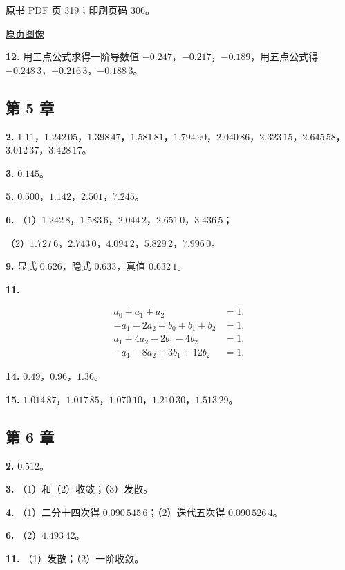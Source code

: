 \clearpage

原书 PDF 页 319；印刷页码 306。

\href{source-images/pdf-319.jpeg}{原页图像}

\textbf{12.} 用三点公式求得一阶导数值 \(-0.247\)，\(-0.217\)，\(-0.189\)，用五点公式得 \(-0.248\,3\)，\(-0.216\,3\)，\(-0.188\,3\)。

\subsection{第 5 章}\label{back-ux7b2c-5-ux7ae0}

\textbf{2.} \(1.11\)，\(1.242\,05\)，\(1.398\,47\)，\(1.581\,81\)，\(1.794\,90\)，\(2.040\,86\)，\(2.323\,15\)，\(2.645\,58\)，\(3.012\,37\)，\(3.428\,17\)。

\textbf{3.} \(0.145\)。

\textbf{5.} \(0.500\)，\(1.142\)，\(2.501\)，\(7.245\)。

\textbf{6.} （1）\(1.242\,8\)，\(1.583\,6\)，\(2.044\,2\)，\(2.651\,0\)，\(3.436\,5\)；

（2）\(1.727\,6\)，\(2.743\,0\)，\(4.094\,2\)，\(5.829\,2\)，\(7.996\,0\)。

\textbf{9.} 显式 \(0.626\)，隐式 \(0.633\)，真值 \(0.632\,1\)。

\textbf{11.}

\[
\begin{aligned}
a_0+a_1+a_2&=1,\\
-a_1-2a_2+b_0+b_1+b_2&=1,\\
a_1+4a_2-2b_1-4b_2&=1,\\
-a_1-8a_2+3b_1+12b_2&=1.
\end{aligned}
\]

\textbf{14.} \(0.49\)，\(0.96\)，\(1.36\)。

\textbf{15.} \(1.014\,87\)，\(1.017\,85\)，\(1.070\,10\)，\(1.210\,30\)，\(1.513\,29\)。

\subsection{第 6 章}\label{back-ux7b2c-6-ux7ae0}

\textbf{2.} \(0.512\)。

\textbf{3.} （1）和（2）收敛；（3）发散。

\textbf{4.} （1）二分十四次得 \(0.090\,545\,6\)；（2）迭代五次得 \(0.090\,526\,4\)。

\textbf{6.} （2）\(4.493\,42\)。

\textbf{11.} （1）发散；（2）一阶收敛。

